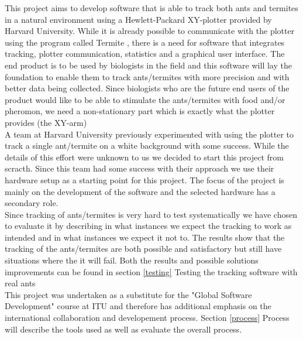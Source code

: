 This project aims to develop software that is able to track both ants and termites in a natural environment using a Hewlett-Packard XY-plotter provided by Harvard University. While it is already possible to communicate with the plotter using the program called Termite \cite{termite}, there is a need for software that integrates tracking, plotter communication, statistics and a graphical user interface. The end product is to be used by biologists in the field and this software will lay the foundation to enable them to track ants/termites with more precision and with better data being collected. Since biologists who are the future end users of the product would like to be able to stimulate the ants/termites with food and/or pheromon, we need a non-stationary part which is exactly what the plotter provides (the XY-arm) \\

A team at Harvard University previously experimented with using the plotter to track a single ant/termite on a white background with some success. While the details of this effort were unknown to us we decided to start this project from scracth. Since this team had some success with their approach we use their hardware setup as a starting point for this project. The focus of the project is mainly on the development of the software and the selected hardware has a secondary role. \\

Since tracking of ants/termites is very hard to test systematically we have chosen to evaluate it by describing in what instances we expect the tracking to work as intended and in what instances we expect it not to. The results show that the tracking of the ants/termites are both possible and satisfactory but still have situations where the it will fail. Both the results and possible solutions improvements can be found in section \ref{testing} Testing the tracking software with real ants \\

This project was undertaken as a substitute for the "Global Software Development" course at ITU and therefore has additional emphasis on the international collaboration and developement process. Section \ref{process} Process will describe the tools used as well as evaluate the overall process. \\ 

